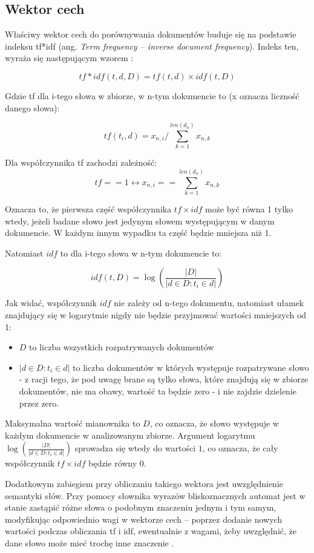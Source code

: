 \documentclass{article}
\begin{document}
\subsection{Wektor cech}

Właściwy wektor cech do porównywania dokumentów buduje się na podstawie indeksu tf*idf (ang. \textit{Term frequency – inverse document frequency}). Indeks ten, wyraża się następującym wzorem :

\[ tf*idf(t, d, D) = tf(t, d)\times idf(t, D) \]

Gdzie tf dla i-tego słowa w zbiorze, w n-tym dokumencie to (x oznacza liczność danego słowa):

\[ tf(t_{i}, d) = x_{n,i} / \sum_{k=1}^{len(d_{n})}x_{n,k} \]

Dla współczynnika tf zachodzi zależność: \[ tf == 1 \leftrightarrow x_{n,i} == \sum_{k=1}^{len(d_{n})}x_{n,k} \]

Oznacza to, że pierwsza część współczynnika $tf \times idf$ może być równa 1 tylko wtedy, jeżeli badane słowo jest jedynym słowem występującym w danym dokumencie. W każdym innym wypadku ta część będzie mniejsza niż 1. 

Natomiast $idf$ to dla i-tego słowa w n-tym dokumencie to: 

\[ idf(t, D) = \log(\frac{|D|}{|d \in D: t_{i} \in d|})  \]

Jak widać, współczynnik $idf$ nie zależy od n-tego dokumentu, natomiast ułamek znajdujący się w logarytmie nigdy nie będzie przyjmować wartości mniejszych od 1:
\begin{itemize}
	\item $D$ to liczba wszystkich rozpatrywanych dokumentów
	\item $|d \in D: t_{i} \in d|$ to liczba dokumentów w których występuje rozpatrywane słowo - z racji tego, że pod uwagę brane są tylko słowa, które znajdują się w zbiorze dokumentów, nie ma obawy, wartość ta będzie zero - i nie zajdzie dzielenie przez zero. 
\end{itemize}
Maksymalna wartość mianownika to $D$, co oznacza, że słowo występuje w każdym dokumencie w analizowanym zbiorze. Argument logarytmu $\log(\frac{|D|}{|d \in D: t_{i} \in d|})$ sprowadza się wtedy do wartości $1$, co oznacza, że cały współczynnik $tf \times idf$ będzie równy 0.

Dodatkowym zabiegiem przy obliczaniu takiego wektora jest uwzględnienie semantyki słów. Przy pomocy słownika wyrazów bliskoznacznych automat jest w stanie zastąpić różne słowa o podobnym znaczeniu jednym i tym samym, modyfikując odpowiednio wagi w wektorze cech – poprzez dodanie nowych wartości podczas obliczania tf i idf, ewentualnie z wagami, żeby uwzględnić, że dane słowo może mieć trochę inne znaczenie .
\end{document}
